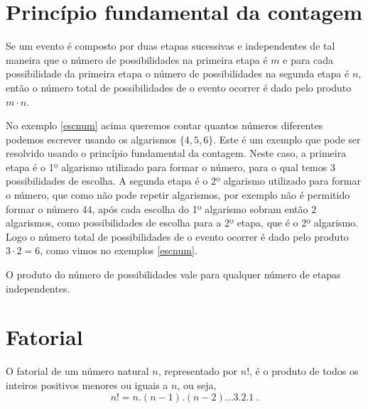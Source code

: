 \section{Princípio fundamental da contagem}

 \vskip0.3cm
 \colorbox{azul}{
 \begin{minipage}{0.9\linewidth}
 \begin{center}
  Se um evento é composto por duas etapas sucessivas e independentes de tal maneira que o número de possibilidades na primeira etapa é $m$ e para cada possibilidade da primeira etapa o número de possibilidades na segunda etapa é $n$, então o número total de possibilidades de o evento ocorrer é dado pelo produto $m \cdot n$.
 \end{center}
 \end{minipage}}
 \vskip0.3cm

No exemplo \ref{escnum} acima queremos contar quantos números diferentes podemos escrever usando os algarismos $\{4,5,6\}$. Este é um exemplo que pode ser resolvido usando o princípio fundamental da contagem. Neste caso, a primeira etapa é o 1º algarismo utilizado para formar o número, para o qual temos $3$ possibilidades de escolha. A segunda etapa é o 2º algarismo utilizado para formar o número, que como não pode repetir algarismos, por exemplo não é permitido formar o número $44$, após cada escolha do 1º algarismo sobram então $2$ algarismos, como possibilidades de escolha para a 2º etapa, que é o 2º algarismo. Logo o número total de possibilidades de o evento ocorrer é dado pelo produto $3 \cdot 2= 6$, como vimos no exemplos \ref{escnum}.

\begin{obs}
 O produto do número de possibilidades vale para qualquer número de etapas independentes.
\end{obs}


\section{Fatorial}

\vskip0.3cm
 \colorbox{azul}{
 \begin{minipage}{0.9\linewidth}
 \begin{center}
  O fatorial de um número natural $n$, representado por $n!$, é o produto de todos os inteiros positivos menores ou iguais a $n$, ou seja,
 \[n! = n.(n-1).(n-2)...3.2.1 \ . \]
 \end{center}
 \end{minipage}}
 \vskip0.3cm

